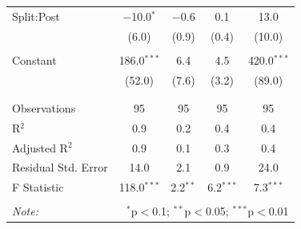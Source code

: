 \documentclass[12pt, a4paper]{article}
\begin{document}
\begin{table}[!htbp]
{\begin{tabular}{@{\extracolsep{5pt}}lcccc}
			Split:Post & $-$10.0$^{*}$ & $-$0.6 & 0.1 & 13.0 \\ 
			& (6.0) & (0.9) & (0.4) & (10.0) \\ 
			& & & & \\ 
			Constant & 186.0$^{***}$ & 6.4 & 4.5 & 420.0$^{***}$ \\ 
			& (52.0) & (7.6) & (3.2) & (89.0) \\ 
			& & & & \\ 
			\hline \\[-1.8ex] 
			Observations & 95 & 95 & 95 & 95 \\ 
			R$^{2}$ & 0.9 & 0.2 & 0.4 & 0.4 \\ 
			Adjusted R$^{2}$ & 0.9 & 0.1 & 0.3 & 0.4 \\ 
			Residual Std. Error & 14.0 & 2.1 & 0.9 & 24.0 \\ 
			F Statistic & 118.0$^{***}$ & 2.2$^{**}$ & 6.2$^{***}$ & 7.3$^{***}$ \\ 
			\hline 
			\hline \\[-1.8ex] 
			\textit{Note:}  & \multicolumn{4}{r}{$^{*}$p$<$0.1; $^{**}$p$<$0.05; $^{***}$p$<$0.01} \\ 
		\end{tabular} }
	\end{table} \clearpage
	
\end{document}
